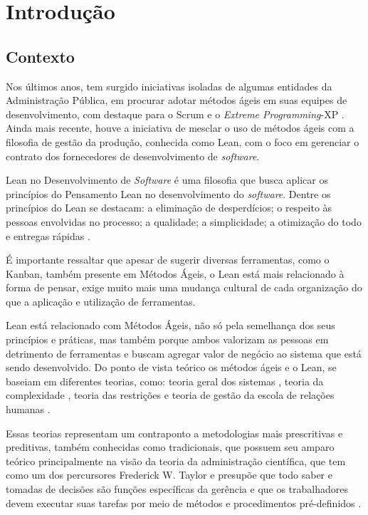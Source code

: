 
\chapter[Introdução]{Introdução}



\section[Contexto]{Contexto}

Nos últimos anos, tem surgido iniciativas isoladas de algumas entidades da Administração Pública, em procurar adotar métodos ágeis em suas equipes de desenvolvimento, com destaque para o Scrum e o \textit{Extreme Programming}-XP \cite{TCU:2013} \cite{RTMAC}.  Ainda mais recente, houve a iniciativa de mesclar o uso de métodos ágeis com a filosofia de gestão da produção, conhecida como Lean, com o foco em gerenciar o contrato dos fornecedores de desenvolvimento de \textit{software}. 

Lean no Desenvolvimento de \textit{Software} é uma filosofia que busca aplicar os princípios do Pensamento Lean no desenvolvimento do \textit{software}. Dentre os princípios do Lean se destacam: a eliminação de desperdícios; o respeito às pessoas envolvidas no processo; a qualidade; a simplicidade; a otimização do todo e entregas rápidas \cite{poppendieck}.

É importante ressaltar que apesar de sugerir diversas ferramentas, como o Kanban, também presente em Métodos Ágeis, o Lean está mais relacionado à forma de pensar, exige muito mais uma mudança cultural de cada organização do que a aplicação e utilização de ferramentas. 

Lean está relacionado com Métodos Ágeis, não só pela semelhança dos seus princípios e práticas, mas também porque ambos valorizam as pessoas em detrimento de ferramentas e buscam agregar valor de negócio ao sistema que está sendo desenvolvido. Do ponto de vista teórico os métodos ágeis e o Lean, se baseiam em diferentes teorias, como: teoria geral dos sistemas \cite{sistemas}, teoria da complexidade \cite{complexidade}, teoria das restrições \cite{katayama2010} e teoria de gestão da escola de relações humanas \cite{administracao}. 

Essas teorias representam um contraponto a metodologias mais prescritivas e preditivas, também conhecidas como tradicionais, que possuem seu amparo teórico principalmente na visão da teoria da administração científica, que tem como um dos percursores Frederick W. Taylor e presupõe que todo saber e tomadas de decisões são funções específicas da gerência e que os trabalhadores devem executar suas tarefas por meio de métodos e procedimentos pré-definidos \cite{administracao}.

